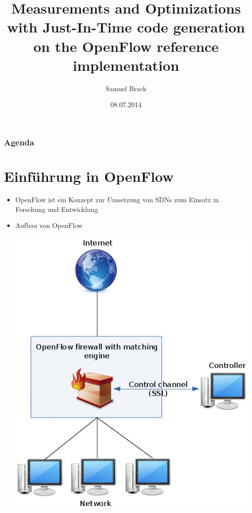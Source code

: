 \documentclass{beamer}
\title[MOJITO]{Measurements and Optimizations with Just-In-Time code generation on the OpenFlow reference implementation}
\author[Samuel Brack]{Samuel Brack}
\institute{Institut für Informatik\\Humboldt-Universität zu Berlin}
\date{08.07.2014}
\begin{document}
\begin{frame}
	\titlepage
\end{frame}

\begin{frame}
	\frametitle{Agenda}
	\tableofcontents
\end{frame}

\section{Einführung in OpenFlow}
\begin{frame}
\begin{itemize}
    \item OpenFlow ist ein Konzept zur Umsetzung von SDNs zum Einsatz in Forschung und Entwicklung
    \item Aufbau von OpenFlow\\
    \begin{center}
    \includegraphics[height=0.8\textheight]{img/openflow_scheme.png}
    \end{center}
\end{itemize}
\end{frame}
\end{document}
